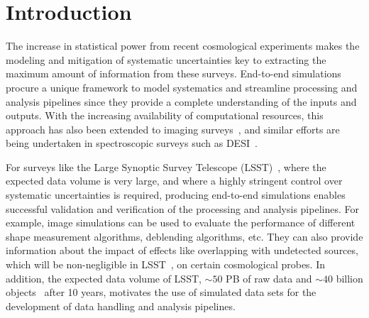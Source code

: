 \documentclass[\docopts]{\docclass}
\begin{document}


\section{Introduction}
\label{sec:intro}
The increase in statistical power from recent cosmological experiments makes the modeling and mitigation of systematic uncertainties key to extracting the maximum amount of information from these surveys. End-to-end simulations~\citep{Brun:118715, 2006JHEP...05..026S,AGOSTINELLI2003250} procure a unique framework to
model systematics and streamline processing and analysis pipelines since they provide a complete understanding of the inputs and outputs. With the increasing availability of computational resources, this approach has also been extended to imaging surveys~\citep{2016ApJ...817...25B}, and similar efforts are being undertaken in spectroscopic surveys such as DESI~\citep{2016arXiv161100036D}.

For surveys like the Large Synoptic Survey Telescope (LSST)~\citep{Overview}, where the expected data volume is very large, and where a highly stringent control over systematic uncertainties is required, producing end-to-end simulations enables successful validation and verification of the processing and analysis pipelines. For example, image simulations can be used to evaluate the performance of different shape measurement algorithms, deblending algorithms, etc. They can also provide information about the impact of effects like overlapping with undetected sources, which will be non-negligible in LSST~\citep{2016ApJ...816...11D}, on certain cosmological probes. In addition, the expected data volume of LSST, $\sim 50$ PB of raw data and $\sim 40$ billion objects~\citep{Overview} after 10 years, motivates the use of simulated data sets for the development of data handling and analysis pipelines.  
\end{document}
